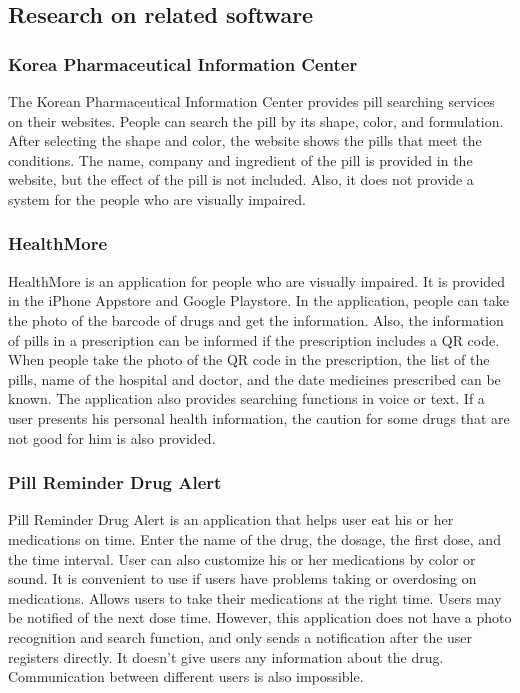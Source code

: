\documentclass[conference]{IEEEtran}
\begin{document}
\subsection{Research on related  software}
\subsubsection{Korea Pharmaceutical Information Center}
The Korean Pharmaceutical Information Center provides pill searching services on their websites. People can search the pill by its shape, color, and formulation. After selecting the shape and color, the website shows the pills that meet the conditions. The name, company and ingredient of the pill is provided in the website, but the effect of the pill is not included. Also, it does not provide a system for the people who are visually impaired.\\

\subsubsection{HealthMore}
HealthMore is an application for people who are visually impaired. It is provided in the  iPhone Appstore and Google Playstore. In the application, people can take the photo of the barcode of drugs and get the information. Also, the information of pills in a prescription can be informed if the prescription includes a QR code. When people take the photo of the QR code in the prescription, the list of the pills, name of the hospital and doctor, and the date medicines prescribed  can be known. The application also provides searching functions in voice or text. If a user presents his personal health information, the caution for some drugs that are not good for him is also provided.\\

\subsubsection{Pill Reminder Drug Alert}
Pill Reminder Drug Alert is an application that helps user eat his or her medications on time. Enter the name of the drug, the dosage, the first dose, and the time interval. User can also customize his or her medications by color or sound. It is convenient to use if users have problems taking or overdosing on medications. Allows users to take their medications at the right time. Users may be notified of the next dose time. However, this application does not have a photo recognition and search function, and only sends a notification after the user registers directly. It doesn't give users any information about the drug. Communication between different users is also impossible.\\
\end{document}
